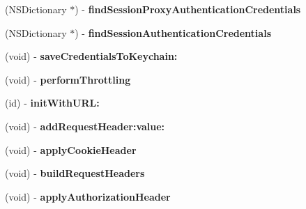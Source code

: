 \begin{DoxyCompactItemize}
\item 
\hypertarget{interface_a_s_i_h_t_t_p_request_a480d62ba0d9ba8d1a64b25b45fb2d965}{
(\-N\-S\-Dictionary $\ast$) -\/ {\bfseries find\-Session\-Proxy\-Authentication\-Credentials}}
\label{interface_a_s_i_h_t_t_p_request_a480d62ba0d9ba8d1a64b25b45fb2d965}

\item 
\hypertarget{interface_a_s_i_h_t_t_p_request_a0f38ffc0ae199e83262895f640c9c263}{
(\-N\-S\-Dictionary $\ast$) -\/ {\bfseries find\-Session\-Authentication\-Credentials}}
\label{interface_a_s_i_h_t_t_p_request_a0f38ffc0ae199e83262895f640c9c263}

\item 
\hypertarget{interface_a_s_i_h_t_t_p_request_a3a57684f5aba49781ec3c9c9ef1516a6}{
(void) -\/ {\bfseries save\-Credentials\-To\-Keychain\-:}}
\label{interface_a_s_i_h_t_t_p_request_a3a57684f5aba49781ec3c9c9ef1516a6}

\item 
\hypertarget{interface_a_s_i_h_t_t_p_request_a510b47cc1be0b9c1968a9c8cc3859038}{
(void) -\/ {\bfseries perform\-Throttling}}
\label{interface_a_s_i_h_t_t_p_request_a510b47cc1be0b9c1968a9c8cc3859038}

\item 
\hypertarget{interface_a_s_i_h_t_t_p_request_aec75eeba26544a9da35e795011fe4a42}{
(id) -\/ {\bfseries init\-With\-U\-R\-L\-:}}
\label{interface_a_s_i_h_t_t_p_request_aec75eeba26544a9da35e795011fe4a42}

\item 
\hypertarget{interface_a_s_i_h_t_t_p_request_a0e969f091acb07bbbe6dbc9295260d64}{
(void) -\/ {\bfseries add\-Request\-Header\-:value\-:}}
\label{interface_a_s_i_h_t_t_p_request_a0e969f091acb07bbbe6dbc9295260d64}

\item 
\hypertarget{interface_a_s_i_h_t_t_p_request_a96645d25afb711168d8722089ad0da60}{
(void) -\/ {\bfseries apply\-Cookie\-Header}}
\label{interface_a_s_i_h_t_t_p_request_a96645d25afb711168d8722089ad0da60}

\item 
\hypertarget{interface_a_s_i_h_t_t_p_request_a84fd344945df932bb1499066a6136b44}{
(void) -\/ {\bfseries build\-Request\-Headers}}
\label{interface_a_s_i_h_t_t_p_request_a84fd344945df932bb1499066a6136b44}

\item 
\hypertarget{interface_a_s_i_h_t_t_p_request_a585f10faa599a2d9c27a5013653901e8}{
(void) -\/ {\bfseries apply\-Authorization\-Header}}
\label{interface_a_s_i_h_t_t_p_request_a585f10faa599a2d9c27a5013653901e8}


\end{DoxyCompactItemize}
